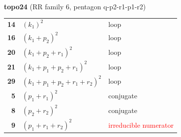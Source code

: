 \documentclass[10pt]{article}
\begin{document}
\begin{minipage}[t]{0.48\textwidth}
{}\\[2mm]\textbf{topo24} (RR family 6, pentagon q-p2-r1-p1-r2)\\[2pt]{\footnotesize\begin{tabular}{@{}r@{\ \ }l@{\ \ }l@{}}\textbf{14} & $(k_1)^2$ & loop\\
\textbf{16} & $(k_1+p_2)^2$ & loop\\
\textbf{20} & $(k_1+p_2+r_1)^2$ & loop\\
\textbf{21} & $(k_1+p_1+p_2+r_1)^2$ & loop\\
\textbf{29} & $(k_1+p_1+p_2+r_1+r_2)^2$ & loop\\
\textbf{5} & $(p_1+r_1)^2$ & conjugate\\
\textbf{8} & $(p_2+r_2)^2$ & conjugate\\
\textbf{9} & $(p_1+r_1+r_2)^2$ & \textcolor{red}{irreducible numerator}\\\end{tabular}}\end{minipage}

\bigskip
\end{document}
